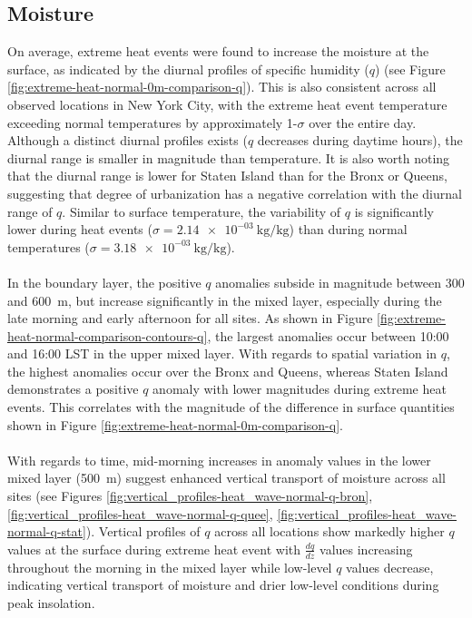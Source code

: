 \documentclass[11pt,a4paper]{article}
\begin{document}
\subsection{Moisture}
On average, extreme heat events were found to increase the moisture at the surface, as indicated by the diurnal profiles of specific humidity ($q$) (see Figure \ref{fig:extreme-heat-normal-0m-comparison-q}). This is also consistent across all observed locations in New York City, with the extreme heat event temperature exceeding normal temperatures by approximately 1-$\sigma$ over the entire day. Although a distinct diurnal profiles exists ($q$ decreases during daytime hours), the diurnal range is smaller in magnitude than temperature. It is also worth noting that the diurnal range is lower for Staten Island than for the Bronx or Queens, suggesting that degree of urbanization has a negative correlation with the diurnal range of $q$. Similar to surface temperature, the variability of $q$ is significantly lower during heat events ($ \sigma = \SI{2.14e-03}{\kilo\gram\per\kilo\gram} $) than during normal temperatures ($ \sigma = \SI{3.18e-03}{\kilo\gram\per\kilo\gram} $).
\\ \\
In the boundary layer, the positive $q$ anomalies subside in magnitude between 300 and \SI{600}{\meter}, but increase significantly in the mixed layer, especially during the late morning and early afternoon for all sites. As shown in Figure \ref{fig:extreme-heat-normal-comparison-contours-q}, the largest anomalies occur between 10:00 and 16:00 LST in the upper mixed layer. With regards to spatial variation in $q$, the highest anomalies occur over the Bronx and Queens, whereas Staten Island demonstrates a positive $q$ anomaly with lower magnitudes during extreme heat events. This correlates with the magnitude of the difference in surface quantities shown in Figure \ref{fig:extreme-heat-normal-0m-comparison-q}. 
\\ \\
With regards to time, mid-morning increases in anomaly values in the lower mixed layer (\texttildelow \SI{500}{\meter}) suggest enhanced vertical transport of moisture across all sites (see Figures \ref{fig:vertical_profiles-heat_wave-normal-q-bron}, \ref{fig:vertical_profiles-heat_wave-normal-q-quee}, \ref{fig:vertical_profiles-heat_wave-normal-q-stat}). Vertical profiles of $q$ across all locations show markedly higher $q$ values at the surface during extreme heat event with $\frac{dq}{dz}$ values increasing throughout the morning in the mixed layer while low-level $q$ values decrease, indicating vertical transport of moisture and drier low-level conditions during peak insolation.
\end{document}
